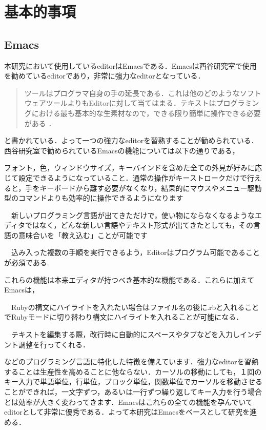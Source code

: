 \chapter{基本的事項}\label{ux57faux672cux7684ux4e8bux9805}

    \section{Emacs}\label{emacs}

    本研究において使用しているeditorはEmacsである．Emacsは西谷研究室で使用を勧めているeditorであり，非常に強力なeditorとなっている．
\begin{quotation}
ツールはプログラマ自身の手の延長である．これは他のどのようなソフトウェアツールよりもEditorに対して当てはまる．テキストはプログラミングにおける最も基本的な生素材なので，できる限り簡単に操作できる必要がある \cite{達人プログラマー}． 
\end{quotation}と書かれている．よって一つの強力なeditorを習熟することが勧められている．西谷研究室で勧められているEmacsの機能については以下の通りである，

\begin{description}
\def\labelenumi{\arabic{enumi}.}
\tightlist
\item[設定可能である] フォント，色，ウィンドウサイズ，キーバインドを含めた全ての外見が好みに応じて設定できるようになっていること．通常の操作がキーストロークだけで行えると，手をキーボードから離す必要がなくなり，結果的にマウスやメニュー駆動型のコマンドよりも効率的に操作できるようになります
\item[拡張性がある]　新しいプログラミング言語が出てきただけで，使い物にならなくなるようなエディタではなく，どんな新しい言語やテキスト形式が出てきたとしても，その言語の意味合いを「教え込む」ことが可能です
\item[プログラム可能であること]　込み入った複数の手順を実行できるよう，Editorはプログラム可能であることが必須である.
\end{description}
これらの機能は本来エディタが持つべき基本的な機能である．これらに加えてEmacsは，

\begin{description}
\def\labelenumi{\arabic{enumi}.}
\tightlist
\item[構文のハイライト]　Rubyの構文にハイライトを入れたい場合はファイル名の後に.rbと入れることでRubyモードに切り替わり構文にハイライトを入れることが可能になる．
\item[自動インデント]　テキストを編集する際，改行時に自動的にスペースやタブなどを入力しインデント調整を行ってくれる．
\end{description}などのプログラミング言語に特化した特徴を備えています．強力なeditorを習熟することは生産性を高めることに他ならない．カーソルの移動にしても，１回のキー入力で単語単位，行単位，ブロック単位，関数単位でカーソルを移動させることができれば，一文字ずつ，あるいは一行ずつ繰り返してキー入力を行う場合とは効率が大きく変わってきます．Emacsはこれらの全ての機能を孕んでいてeditorとして非常に優秀である．よって本研究はEmacsをベースとして研究を進める．

